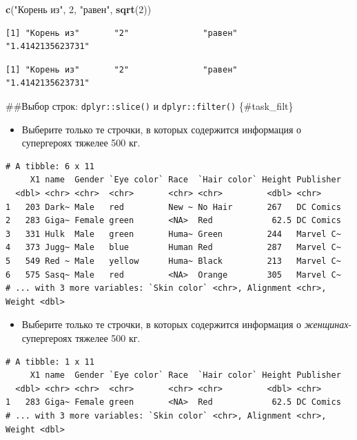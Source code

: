 \documentclass[
]{book}
\newenvironment{Shaded}{\begin{snugshade}}{\end{snugshade}}
\newcommand{\DecValTok}[1]{\textcolor[rgb]{0.00,0.00,0.81}{#1}}
\newcommand{\KeywordTok}[1]{\textcolor[rgb]{0.13,0.29,0.53}{\textbf{#1}}}
\newcommand{\NormalTok}[1]{#1}
\newcommand{\StringTok}[1]{\textcolor[rgb]{0.31,0.60,0.02}{#1}}
\providecommand{\tightlist}{%
  \setlength{\itemsep}{0pt}\setlength{\parskip}{0pt}}
\begin{document}
\begin{Shaded}
\begin{Highlighting}[]
\KeywordTok{c}\NormalTok{(}\StringTok{"Корень из"}\NormalTok{, }\DecValTok{2}\NormalTok{, }\StringTok{"равен"}\NormalTok{, }\KeywordTok{sqrt}\NormalTok{(}\DecValTok{2}\NormalTok{))}
\end{Highlighting}
\end{Shaded}

\begin{verbatim}
[1] "Корень из"       "2"               "равен"           "1.4142135623731"
\end{verbatim}

\begin{verbatim}
[1] "Корень из"       "2"               "равен"           "1.4142135623731"
\end{verbatim}

\#\#Выбор строк: \texttt{dplyr::slice()} и \texttt{dplyr::filter()} \{\#task\_filt\}

\begin{itemize}
\tightlist
\item
  Выберите только те строчки, в которых содержится информация о супергероях тяжелее 500 кг.
\end{itemize}

\begin{verbatim}
# A tibble: 6 x 11
     X1 name  Gender `Eye color` Race  `Hair color` Height Publisher
  <dbl> <chr> <chr>  <chr>       <chr> <chr>         <dbl> <chr>    
1   203 Dark~ Male   red         New ~ No Hair       267   DC Comics
2   283 Giga~ Female green       <NA>  Red            62.5 DC Comics
3   331 Hulk  Male   green       Huma~ Green         244   Marvel C~
4   373 Jugg~ Male   blue        Human Red           287   Marvel C~
5   549 Red ~ Male   yellow      Huma~ Black         213   Marvel C~
6   575 Sasq~ Male   red         <NA>  Orange        305   Marvel C~
# ... with 3 more variables: `Skin color` <chr>, Alignment <chr>, Weight <dbl>
\end{verbatim}

\begin{itemize}
\tightlist
\item
  Выберите только те строчки, в которых содержится информация о \emph{женщинах}-супергероях тяжелее 500 кг.
\end{itemize}

\begin{verbatim}
# A tibble: 1 x 11
     X1 name  Gender `Eye color` Race  `Hair color` Height Publisher
  <dbl> <chr> <chr>  <chr>       <chr> <chr>         <dbl> <chr>    
1   283 Giga~ Female green       <NA>  Red            62.5 DC Comics
# ... with 3 more variables: `Skin color` <chr>, Alignment <chr>, Weight <dbl>
\end{verbatim}
\end{document}
